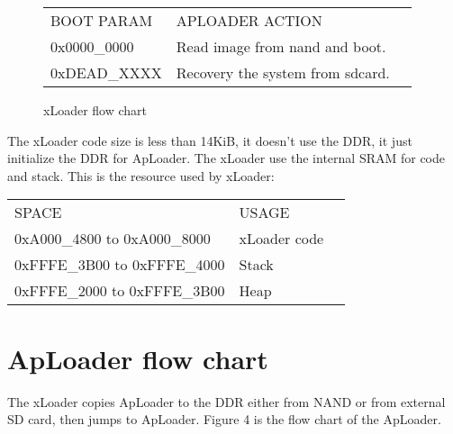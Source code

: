 \documentclass[11pt]{article}
\begin{document}
\begin{figure}[H]
	\begin{footnotesize}
	\begin{longtable}[l]{llp{}}
	BOOT PARAM		&	APLOADER ACTION						\\
	0x0000\_0000	&	Read image from nand and boot.		\\
	0xDEAD\_XXXX	&	Recovery the system from sdcard.
	\end{longtable}
	\end{footnotesize}
\caption{xLoader flow chart}
\end{figure}

	The xLoader code size is less than 14KiB, it doesn't use the DDR, it just initialize the
	DDR for ApLoader. The xLoader use the internal SRAM for code and stack. This is the resource
	used by xLoader:
\begin{footnotesize}
\begin{longtable}[l]{llp{}}
SPACE							& USAGE						\\
0xA000\_4800 to 0xA000\_8000	& xLoader code				\\
0xFFFE\_3B00 to 0xFFFE\_4000	& Stack						\\
0xFFFE\_2000 to 0xFFFE\_3B00	& Heap						
\end{longtable}
\end{footnotesize}

\section{ApLoader flow chart}
	The xLoader copies ApLoader to the DDR either from NAND or from external SD card, then
	jumps to ApLoader. Figure 4 is the flow chart of the ApLoader.
\end{document}
